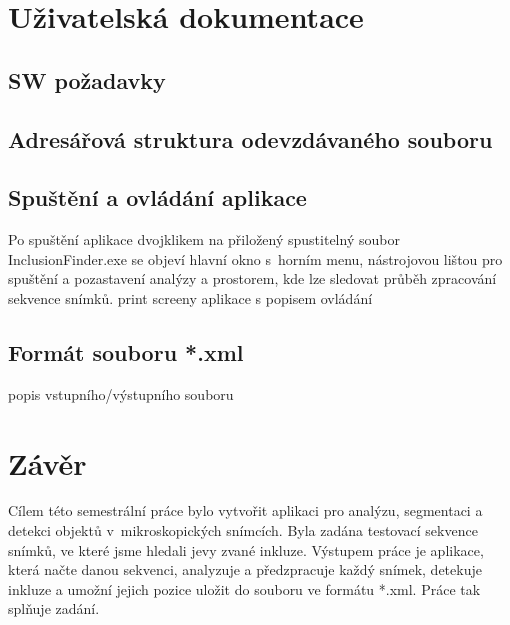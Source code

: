 \documentclass[12pt, a4paper]{report}
\begin{document}
\chapter{Uživatelská dokumentace}
	\section{SW požadavky}
	
	\section{Adresářová struktura odevzdávaného souboru}	
	
	\section{Spuštění a ovládání aplikace}	
Po spuštění aplikace dvojklikem na přiložený spustitelný soubor InclusionFinder.exe se objeví hlavní okno s~horním menu, nástrojovou lištou pro spuštění a pozastavení analýzy a prostorem, kde lze sledovat průběh zpracování sekvence snímků.	
	print screeny aplikace s popisem ovládání
	\section{Formát souboru *.xml}
	popis vstupního/výstupního souboru

\chapter{Závěr}
Cílem této semestrální práce bylo vytvořit aplikaci pro analýzu, segmentaci a detekci objektů v~mikroskopických snímcích. Byla zadána testovací sekvence snímků, ve které jsme hledali jevy zvané inkluze. Výstupem práce je aplikace, která načte danou sekvenci, analyzuje a předzpracuje každý snímek, detekuje inkluze a umožní jejich pozice uložit do souboru ve formátu *.xml. Práce tak splňuje zadání.
\end{document}
